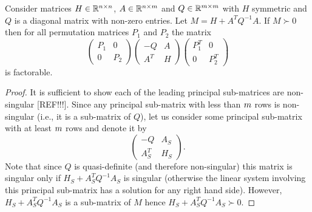 \documentclass{article}
\begin{document}
\begin{lemma}\label{lem:when-factorable}
Consider matrices $H  \in \mathbb{R}^{n \times n}$, $A \in \mathbb{R}^{n \times m}$ and $Q \in \mathbb{R}^{m \times m}$ with $H$ symmetric and $Q$ is a diagonal matrix with non-zero entries. Let $M = H + A^T Q^{-1} A$. If $M \succ 0$ then for all permutation matrices $P_{1}$ and $P_{2}$ the matrix
$$
\left( \begin{matrix}
P_{1} & 0 \\
0 & P_{2}
\end{matrix} \right)
\left( \begin{matrix}
-Q & A  \\
A^T & H
\end{matrix} \right)
\left( \begin{matrix}
P_{1}^T & 0 \\
0 & P_{2}^T
\end{matrix} \right)
$$
is factorable.
\end{lemma}

\begin{proof}
It is sufficient to show each of the leading principal sub-matrices are non-singular [REF!!!]. Since any principal sub-matrix with less than $m$ rows is non-singular (i.e., it is a sub-matrix of $Q$), let us consider some principal sub-matrix with at least $m$ rows and denote it by
$$
\left(\begin{matrix}
-Q & A_{S}  \\
A^T_{S} & H_{S}
\end{matrix}\right).
$$
Note that since $Q$ is quasi-definite (and therefore non-singular) this matrix is singular only if $H_{S} + A^T_{S} Q^{-1} A_{S}$ is singular (otherwise the linear system involving this principal sub-matrix has a solution for any right hand side). However, $H_{S} + A^T_{S} Q^{-1} A_{S}$ is a sub-matrix of $M$ hence $H_{S} + A^T_{S} Q^{-1} A_{S} \succ 0$.
\end{proof}

\fi







%
\end{document}
